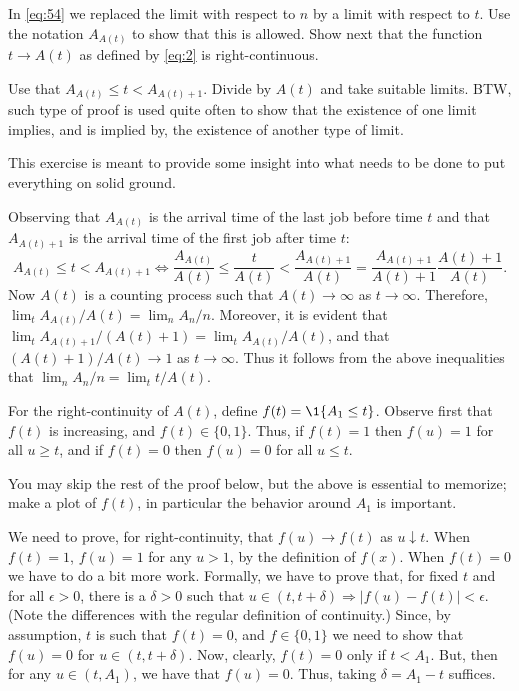 \begin{extra}[\faRocket]
  In \eqref{eq:54} we replaced the limit with respect to $n$ by a limit with respect to $t$.
  Use the notation $A_{A(t)}$ to show that this is allowed.
  Show next that the function $t\to A(t)$ as defined by \eqref{eq:2} is right-continuous.
    \begin{hint}
      Use that $A_{A(t)} \leq t < A_{A(t)+1}$.
      Divide by $A(t)$ and take suitable limits.
      BTW, such type of proof is used quite often to show that the existence of one limit implies, and is implied by, the existence of another type of limit.
    \end{hint}
 \begin{solution}
   This exercise is meant to provide some insight into what needs to be done to put everything on solid ground.


   Observing that $A_{A(t)}$ is the arrival time of the last job before time $t$ and that $A_{A(t)+1}$ is the arrival time of the first job after time $t$:
  \begin{equation*}
    A_{A(t)}  \leq t  < A_{A(t)+1} \Leftrightarrow 
    \frac{A_{A(t)}} {A(t)}  \leq \frac{t}{A(t)}  <\frac{A_{A(t)+1}}{A(t)} = \frac{A_{A(t)+1}}{A(t)+1}\frac{A(t)+1}{A(t)}.
  \end{equation*}
  Now $A(t)$ is a counting process such that $A(t)\to\infty$ as $t\to\infty$.
  Therefore, $\lim_t A_{A(t)}/A(t) = \lim_n A_n/n$.
  Moreover, it is evident that $\lim_t A_{A(t)+1}/(A(t)+1) = \lim_t A_{A(t)}/A(t)$, and that $(A(t)+1)/A(t)\to 1$ as $t\to\infty$.
  Thus it follows from the above inequalities that $\lim_n A_n/n = \lim_t t/A(t)$.
     
  For the right-continuity of $A(t)$, define $f(t) = \1{A_1 \leq t}$.
  Observe first that $f(t)$ is increasing, and $f(t)\in\{0,1\}$.
  Thus, if $f(t)=1$ then $f(u)=1$ for all $u\geq t$, and if $f(t)=0$ then $f(u) = 0$ for all $u\leq t$.

  You may skip the rest of the proof below, but the above is essential to memorize; make a plot of $f(t)$, in particular the behavior around $A_1$ is important.

  We need to prove, for right-continuity, that $f(u)\to f(t) $ as $u\downarrow t$.
  When $f(t)=1$, $f(u)=1$ for any $u>1$, by the definition of $f(x)$.
  When $f(t)=0$ we have to do a bit more work.
  Formally, we have to prove that, for fixed $t$ and for all $\epsilon > 0$, there is a $\delta>0$ such that $u\in(t, t+\delta) \Rightarrow |f(u) -f(t)| < \epsilon$.
  (Note the differences with the regular definition of continuity.)
  Since, by assumption, $t$ is such that $f(t)=0$, and $f\in\{0,1\}$ we need to show that $f(u)=0$ for $u\in(t, t+\delta)$.
  Now, clearly, $f(t)=0$ only if $t < A_1$.
  But, then for any $u\in(t, A_1)$, we have that $f(u) = 0$.
  Thus, taking $\delta = A_1 - t$ suffices.


\end{solution}
\end{extra}

